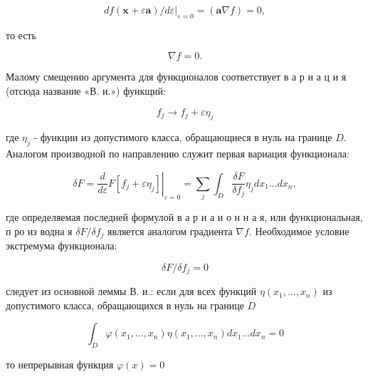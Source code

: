 \documentclass[10pt]{article}
\begin{document}
\[

d f(\boldsymbol{x}+\varepsilon \boldsymbol{a}) /\left.d \varepsilon\right|_{\varepsilon=0}=(\boldsymbol{a} \nabla f)=0,

\]



то есть



\[

\nabla f=0 .

\]



Малому смещению аргумента для функционалов соответствует в а р и а ц и я (отсюда название «В. и.») функщий:



\[

f_{j} \rightarrow f_{j}+\varepsilon \eta_{j}

\]



где $\eta_{j}$ - функции из допустимого класса, обращающиеся в нуль на границе $D$. Аналогом производной по направлению служит первая вариация функционала:



\[

\delta F=\left.\frac{d}{d \varepsilon} F\left[f_{j}+\varepsilon \eta_{j}\right]\right|_{\varepsilon=0}=\sum_{j} \int_{D} \frac{\delta F}{\delta f_{j}} \eta_{j} d x_{1} \ldots d x_{n},

\]



где определяемая последней формулой в а р и а и о н н а я, или функциональная, п ро из водна я $\delta F / \delta f_{j}$ является аналогом градиента $\nabla f$. Необходимое условие экстремума функционала:



\[

\delta F / \delta f_{j}=0

\]



следует из основной леммы В. и.: если для всех функций $\eta\left(x_{1}, \ldots, x_{n}\right)$ из допустимого класса, обращающихся в нуль на границе $D$



\[

\int_{D} \varphi\left(x_{1}, \ldots, x_{n}\right) \eta\left(x_{1}, \ldots, x_{n}\right) d x_{1} \ldots d x_{n}=0

\]



то непрерывная функция $\varphi(x)=0$
\end{document}
